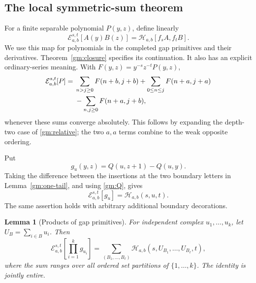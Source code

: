 \documentclass[11pt,a4paper]{article}
\numberwithin{equation}{section}
\newtheorem{lemma}[theorem]{Lemma}
\theoremstyle{definition}
\theoremstyle{remark}
\begin{document}
\subsection{The local symmetric-sum theorem}

For a finite separable polynomial \(P(y,z)\), define linearly
\begin{equation}\label{gm:E}
 \mathcal E_{a,b}^{s,t}[A(y)B(z)]
       =\mathcal H_{a,b}[f_sA,f_tB].
\end{equation}
We use this map for polynomials in the completed gap primitives and
their derivatives.  Theorem~\ref{gm:closure} specifies its continuation.
It also has an explicit ordinary-series meaning.  With
\(F(y,z)=y^{-s}z^{-t}P(y,z)\),
\begin{align}\label{gm:ordinary-E}
 \mathcal E_{a,b}^{s,t}[P]
 ={}&\sum_{n>j\ge0}F(n+b,j+b)
     +\sum_{0\le n\le j}F(n+a,j+a)\notag\\
    &-\sum_{n,j\ge0}F(n+a,j+b),
\end{align}
whenever these sums converge absolutely.  This follows by expanding
the depth-two case of \eqref{gm:relative}; the two \(a,a\) terms
combine to the weak opposite ordering.

Put
\begin{equation}\label{gm:gap}
 g_u(y,z)=Q(u,z+1)-Q(u,y).
\end{equation}
Taking the difference between the insertions at the two boundary
letters in Lemma~\ref{gm:one-tail}, and using \eqref{gm:Q}, gives
\begin{equation}\label{gm:local-insertion}
 \mathcal E_{a,b}^{s,t}[g_u]=\mathcal H_{a,b}(s,u,t).
\end{equation}
The same assertion holds with arbitrary additional boundary
decorations.

\begin{lemma}[Products of gap primitives]
\label{gm:ordered-partitions}
For independent complex \(u_1,\ldots,u_k\), let
\(U_B=\sum_{i\in B}u_i\).  Then
\begin{equation}\label{gm:ordered-partition-formula}
 \mathcal E_{a,b}^{s,t}\!\left[\prod_{i=1}^kg_{u_i}\right]
 =\sum_{(B_1,\ldots,B_\ell)}
      \mathcal H_{a,b}(s,U_{B_1},\ldots,U_{B_\ell},t),
\end{equation}
where the sum ranges over all ordered set partitions of
\(\{1,\ldots,k\}\).  The identity is jointly entire.
\end{lemma}
\end{document}
